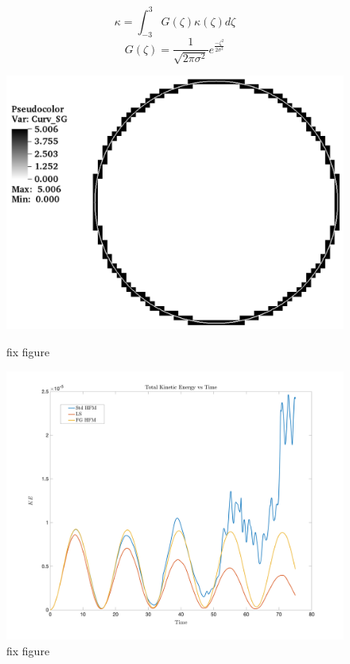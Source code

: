 \vspace{-0.2in}
\begin{equation}
\kappa = \int_{-3}^{3} G(\zeta) \kappa(\zeta) d\zeta
\label{eqn:filt}
\end{equation} 
\begin{equation}
G(\zeta) = \frac{1}{\sqrt{2 \pi \sigma^2}}e^\frac{- \zeta^2}{2\sigma^2}
\label{eqn:G}
\end{equation} 

 \begin{figure}[htbp]
	\centering
	\begin{minipage}{.5\textwidth}
		\centering
		\includegraphics[width=1.0\linewidth]{figs/curvCalc.png}
		\caption{fix figure}
		\label{fig:Gcurv}
	\end{minipage}%
	\begin{minipage}{0.5\textwidth}
		\centering
		\includegraphics[width=1.0\linewidth]{figs/KEvT}
		\caption{fix figure}
		\label{fig:fig:GPlot}
	\end{minipage}
\end{figure}


